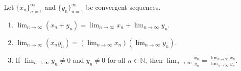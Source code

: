\documentclass[../main.tex]{subfiles}
\begin{document}
    
    
    
    
    
    
    
    
    
    
    
    
    
    
    
    
    
    \begin{proposition} \label{prop:limit_algebra}
    Let \( \{x_n\}_{n=1}^{\infty} \) and \( \{y_n\}_{n=1}^{\infty} \) be convergent sequences.
    \begin{enumerate}
        \item 
        \(
        \lim_{n\to\infty} (x_n + y_n) = \lim_{n\to\infty} x_n + \lim_{n\to\infty} y_n.
        \)
        \item 
        \(
        \lim_{n\to\infty} (x_n y_n) = \left( \lim_{n\to\infty} x_n \right) \left( \lim_{n\to\infty} y_n \right).
        \)
        \item If \( \lim_{n\to\infty} y_n \neq 0 \) and \( y_n \neq 0 \) for all \( n \in \mathbb{N} \), then
        \(
        \lim_{n\to\infty} \frac{x_n}{y_n} = \frac{\lim_{n\to\infty} x_n}{\lim_{n\to\infty} y_n}.
        \)
    \end{enumerate}
    \end{proposition}
    
    
    
    
    
\end{document}
